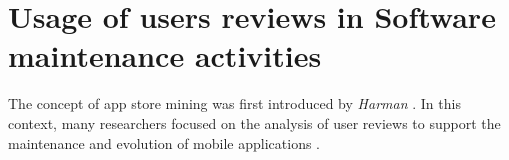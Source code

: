 \section{Usage of users reviews in Software maintenance activities}
The concept of app store mining was first introduced by \textit{Harman} \etal
\cite{appstoremining}. In this context, many researchers focused on the analysis of user reviews to support the maintenance and evolution of mobile applications \cite{surveyappstore}.



